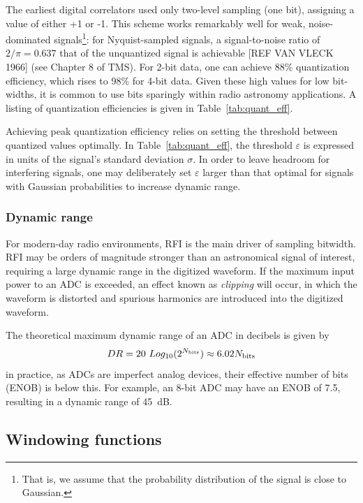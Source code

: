 \documentclass{ws-rv961x669}
\begin{document}
The earliest digital correlators \citep{Weinreb:1963p10042} used only two-level sampling (one bit), assigning a value of either +1 or -1. This scheme works remarkably well for weak, noise-dominated signals\footnote{That is, we assume that the probability distribution of the signal is close to Gaussian.}: for Nyquist-sampled signals, a signal-to-noise ratio of $2/\pi=0.637$ that of the unquantized signal is achievable [REF VAN VLECK 1966] (see Chapter 8 of TMS\citet{ThompsonMoranSwenson2004}). For 2-bit data, one can achieve 88\% quantization efficiency, which rises to 98\% for 4-bit data. Given these high values for low bit-widths, it is common to use bits sparingly within radio astronomy applications. A listing of quantization efficiencies\cite{Thompson:2007p8886} is given in Table~\ref{tab:quant_eff}.


Achieving peak quantization efficiency relies on setting the threshold between quantized values optimally. In Table~\ref{tab:quant_eff}, the threshold $\varepsilon$ is expressed in units of the signal's standard deviation $\sigma$. In order to leave headroom for interfering signals, one may deliberately set $\varepsilon$ larger than that optimal for signals with Gaussian probabilities to increase dynamic range.


\subsubsection{Dynamic range\label{sub:dynamic-range}}

For modern-day radio environments, RFI is the main driver of sampling bitwidth. RFI may be orders of magnitude stronger than an astronomical signal of interest, requiring a large dynamic range in the digitized waveform. If the maximum input power to an ADC is exceeded, an effect known as \emph{clipping} will occur, in which the waveform is distorted and spurious harmonics are introduced into the digitized waveform.

The theoretical maximum dynamic range of an ADC in decibels is given by 
\begin{equation}
	DR = 20~Log_{10}(2^{N_{\rm{bits}}}) \approx 6.02 N_{\rm{bits}}
\end{equation}
in practice, as ADCs are imperfect analog devices, their effective number of bits (ENOB) is below this. For example, an 8-bit ADC may have an ENOB of 7.5, resulting in a dynamic range of 45~dB.



\subsection{Windowing functions}
\end{document}
